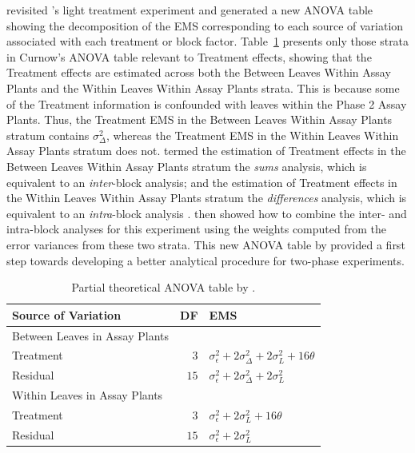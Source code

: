 \cite{Curnow1959} revisited \citeauthor{McIntyre1955}'s light treatment experiment and generated a new ANOVA table showing the decomposition of the EMS corresponding to each source of variation associated with each treatment or block factor. Table~\ref{tab:Curnow1959} presents only those strata in Curnow's ANOVA table relevant to Treatment effects, showing that the Treatment effects are estimated across both the Between Leaves Within Assay Plants and the Within Leaves Within Assay Plants strata. This is because some of the Treatment information is confounded with leaves within the Phase 2 Assay Plants. Thus, the Treatment EMS in the Between Leaves Within Assay Plants stratum contains $\sigma_{\Delta}^2$, whereas the Treatment EMS in the Within Leaves Within Assay Plants stratum does not. \cite{Curnow1959} termed the estimation of Treatment effects in the Between Leaves Within Assay Plants stratum the \emph{sums} analysis, which is equivalent to an \emph{inter}-block analysis; and the estimation of Treatment effects in the Within Leaves Within Assay Plants stratum the \emph{differences} analysis, which is equivalent to an \emph{intra}-block analysis \citep{Yates1936}. \cite{Curnow1959} then showed how to combine the inter- and intra-block analyses for this experiment using the weights computed from the error variances from these two strata. This new ANOVA table by \cite{Curnow1959} provided a first step towards developing a better analytical procedure for two-phase experiments. 
 
\begin{table}[ht]
\centering
\caption{Partial theoretical ANOVA table by \cite{Curnow1959}.}
\begin{tabular}{lrl} 
\toprule 
\multicolumn{1}{l}{\textbf{Source of Variation}} & \multicolumn{1}{l}{\textbf{DF}} & \multicolumn{1}{l}{\textbf{EMS}}\\ 
\midrule 
Between Leaves in Assay Plants & & \\ 
\quad Treatment & $3$ & $\sigma_{\epsilon}^2 + 2\sigma_{\Delta}^2 + 2\sigma_{L}^2 + 16\theta$ \\ 
\quad Residual & $15$ & $\sigma_{\epsilon}^2 + 2\sigma_{\Delta}^2 + 2\sigma_{L}^2$ \\  \hline
Within Leaves in Assay Plants & & \\
\quad Treatment & $3$ & $\sigma_{\epsilon}^2 +  2\sigma_{L}^2 + 16\theta$ \\ 
\quad Residual & $15$ & $\sigma_{\epsilon}^2 +  2\sigma_{L}^2 $ \\  
\bottomrule 
\end{tabular}
\label{tab:Curnow1959} 
\end{table} 
 
